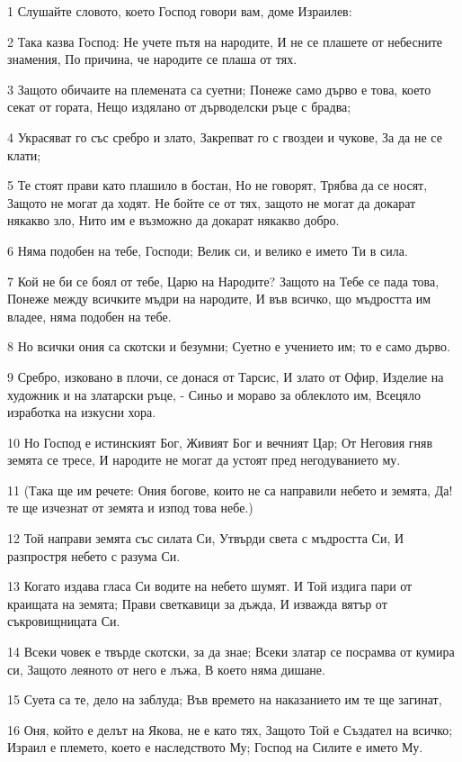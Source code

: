 \par 1 Слушайте словото, което Господ говори вам, доме Израилев:
\par 2 Така казва Господ: Не учете пътя на народите, И не се плашете от небесните знамения, По причина, че народите се плаша от тях.
\par 3 Защото обичаите на племената са суетни; Понеже само дърво е това, което секат от гората, Нещо издялано от дърводелски ръце с брадва;
\par 4 Украсяват го със сребро и злато, Закрепват го с гвоздеи и чукове, За да не се клати;
\par 5 Те стоят прави като плашило в бостан, Но не говорят, Трябва да се носят, Защото не могат да ходят. Не бойте се от тях, защото не могат да докарат някакво зло, Нито им е възможно да докарат някакво добро.
\par 6 Няма подобен на тебе, Господи; Велик си, и велико е името Ти в сила.
\par 7 Кой не би се боял от тебе, Царю на Народите? Защото на Тебе се пада това, Понеже между всичките мъдри на народите, И във всичко, що мъдростта им владее, няма подобен на тебе.
\par 8 Но всички ония са скотски и безумни; Суетно е учението им; то е само дърво.
\par 9 Сребро, изковано в плочи, се донася от Тарсис, И злато от Офир, Изделие на художник и на златарски ръце, - Синьо и мораво за облеклото им, Всецяло изработка на изкусни хора.
\par 10 Но Господ е истинският Бог, Живият Бог и вечният Цар; От Неговия гняв земята се тресе, И народите не могат да устоят пред негодуванието му.
\par 11 (Така ще им речете: Ония богове, които не са направили небето и земята, Да! те ще изчезнат от земята и изпод това небе.)
\par 12 Той направи земята със силата Си, Утвърди света с мъдростта Си, И разпростря небето с разума Си.
\par 13 Когато издава гласа Си водите на небето шумят. И Той издига пари от краищата на земята; Прави светкавици за дъжда, И изважда вятър от съкровищницата Си.
\par 14 Всеки човек е твърде скотски, за да знае; Всеки златар се посрамва от кумира си, Защото леяното от него е лъжа, В което няма дишане.
\par 15 Суета са те, дело на заблуда; Във времето на наказанието им те ще загинат,
\par 16 Оня, който е делът на Якова, не е като тях, Защото Той е Създател на всичко; Израил е племето, което е наследството Му; Господ на Силите е името Му.
